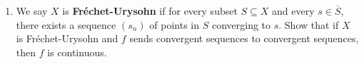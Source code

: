 \documentclass[12pt]{article}
\theoremstyle{definition}
\begin{document}
\begin{enumerate}[roomy]
\begin{enumerate}
\item We say $X$ is {\bf Fr\'echet-Urysohn} if for every subset $S \subseteq X$ and every $s \in \overline{S}$, there exists a sequence $(s_n)$ of points in $S$ converging to $s$. Show that if $X$ is Fr\'echet-Urysohn and $f$ sends convergent sequences to convergent sequences, then $f$ is continuous.
\end{enumerate}



\end{enumerate}
\end{document}
